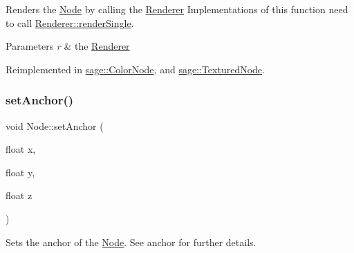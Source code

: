 Renders the \mbox{\hyperlink{classsage_1_1Node}{Node}} by calling the \mbox{\hyperlink{classsage_1_1Renderer}{Renderer}} Implementations of this function need to call \mbox{\hyperlink{classsage_1_1Renderer_aa79cfd587fa85ae8ea7ccf465825d212}{Renderer\+::render\+Single}}. 


\begin{DoxyParams}{Parameters}
{\em r} & the \mbox{\hyperlink{classsage_1_1Renderer}{Renderer}} \\
\hline
\end{DoxyParams}


Reimplemented in \mbox{\hyperlink{classsage_1_1ColorNode_ac2cf18feb8ab4e55dd68ca8b0c4faabf}{sage\+::\+Color\+Node}}, and \mbox{\hyperlink{classsage_1_1TexturedNode_a3ced7cf384aac86fb84face2dc62e395}{sage\+::\+Textured\+Node}}.

\mbox{\label{classsage_1_1Node_a04d15cec594320725e6ef44756346d2a}} 
\subsubsection{\texorpdfstring{setAnchor()}{setAnchor()}\hspace{0.1cm}{\footnotesize\ttfamily [1/4]}}
{\footnotesize\ttfamily void Node\+::set\+Anchor (\begin{DoxyParamCaption}\item[{float}]{x,  }\item[{float}]{y,  }\item[{float}]{z }\end{DoxyParamCaption})}



Sets the anchor of the \mbox{\hyperlink{classsage_1_1Node}{Node}}. See anchor for further details. 


